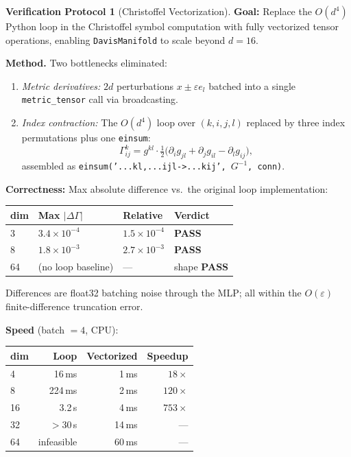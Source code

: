 \documentclass[11pt,a4paper]{article}
\theoremstyle{definition}
\newtheorem{protocol}[theorem]{Verification Protocol}
\theoremstyle{remark}
\begin{document}
\begin{protocol}[Christoffel Vectorization]\label{prot:christoffel_vec}
\textbf{Goal:} Replace the $O(d^4)$ Python loop in the Christoffel 
symbol computation with fully vectorized tensor operations, enabling 
\texttt{DavisManifold} to scale beyond $d = 16$.

\textbf{Method.} Two bottlenecks eliminated:
\begin{enumerate}[nosep]
  \item \emph{Metric derivatives:} $2d$ perturbations 
  $x \pm \varepsilon e_l$ batched into a single 
  \texttt{metric\_tensor} call via broadcasting.
  \item \emph{Index contraction:} The $O(d^4)$ loop over 
  $(k, i, j, l)$ replaced by three index permutations plus 
  one \texttt{einsum}:
  \[
    \Gamma^k_{ij} = g^{kl}\!\cdot\tfrac{1}{2}
    \bigl(\partial_i g_{jl} + \partial_j g_{il} - \partial_l g_{ij}\bigr),
  \]
  assembled as 
  \texttt{einsum('...kl,...ijl->...kij', $G^{-1}$, conn)}.
\end{enumerate}

\textbf{Correctness:} Max absolute difference vs.\ the original 
loop implementation:
\begin{center}
\begin{tabular}{llll}
\toprule
dim & Max $|\Delta\Gamma|$ & Relative & Verdict \\
\midrule
3  & $3.4 \times 10^{-4}$ & $1.5 \times 10^{-4}$ & \textbf{PASS} \\
8  & $1.8 \times 10^{-3}$ & $2.7 \times 10^{-3}$ & \textbf{PASS} \\
64 & (no loop baseline) & --- & shape \textbf{PASS} \\
\bottomrule
\end{tabular}
\end{center}
Differences are float32 batching noise through the MLP; 
all within the $O(\varepsilon)$ finite-difference truncation error.

\textbf{Speed} (batch $= 4$, CPU):
\begin{center}
\begin{tabular}{lrrr}
\toprule
dim & Loop & Vectorized & Speedup \\
\midrule
4  & 16\,ms  & 1\,ms   & $18\times$ \\
8  & 224\,ms & 2\,ms   & $120\times$ \\
16 & 3.2\,s  & 4\,ms   & $753\times$ \\
32 & $>$30\,s & 14\,ms  & --- \\
64 & infeasible & 60\,ms & --- \\
\bottomrule
\end{tabular}
\end{center}


\end{protocol}
\end{document}
